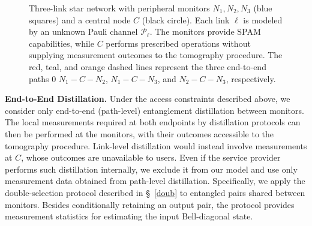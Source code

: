 \begin{figure}[tb]
    \caption{ Three-link star network with peripheral monitors \(N_1,N_2,N_3\) (blue squares) and a central node \(C\) (black circle). Each link \(\ell\) is modeled by an unknown Pauli channel \(\mathcal P_\ell \). The monitors provide SPAM capabilities, while \(C\) performs prescribed operations without supplying measurement outcomes to the tomography procedure. The red, teal, and orange dashed lines represent the three end-to-end paths
0        $N_1\!-\!C\!-\!N_2$, $N_1\!-\!C\!-\!N_3$, and $N_2\!-\!C\!-\!N_3$, respectively. }
    \label{fig:three-link-star}
\end{figure}


\textbf{End-to-End Distillation.}
Under the access constraints described above, we consider only
end-to-end (path-level) entanglement distillation between monitors. The local measurements required at both endpoints
by distillation protocols  can then be performed at the
monitors, with their outcomes accessible to the tomography procedure.
Link-level distillation would instead involve measurements at \(C\),
whose outcomes are unavailable to users. Even if the service provider
performs such distillation internally, we exclude it from our model
and use only measurement data obtained from path-level distillation. Specifically, we apply the double-selection protocol described in
\S~\ref{doub} to entangled pairs shared between monitors.
Besides conditionally retaining an output pair, the protocol
provides measurement statistics for estimating the input Bell-diagonal state.

